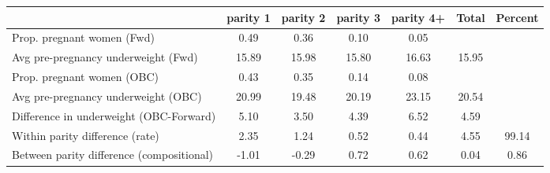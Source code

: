 \begin{tabular}{l*{6}{c}}
\toprule
            &\multicolumn{1}{c}{parity 1}&\multicolumn{1}{c}{parity 2}&\multicolumn{1}{c}{parity 3}&\multicolumn{1}{c}{parity 4+}&\multicolumn{1}{c}{Total}&\multicolumn{1}{c}{Percent}\\
\midrule
\midrule
Prop. pregnant women (Fwd)&        0.49&        0.36&        0.10&        0.05&            &            \\
Avg pre-pregnancy underweight (Fwd)&       15.89&       15.98&       15.80&       16.63&       15.95&            \\
Prop. pregnant women (OBC)&        0.43&        0.35&        0.14&        0.08&            &            \\
Avg pre-pregnancy underweight (OBC)&       20.99&       19.48&       20.19&       23.15&       20.54&            \\
Difference in underweight (OBC-Forward)&        5.10&        3.50&        4.39&        6.52&        4.59&            \\
Within parity difference (rate)&        2.35&        1.24&        0.52&        0.44&        4.55&       99.14\\
Between parity difference (compositional)&       -1.01&       -0.29&        0.72&        0.62&        0.04&        0.86\\
\bottomrule
\end{tabular}
